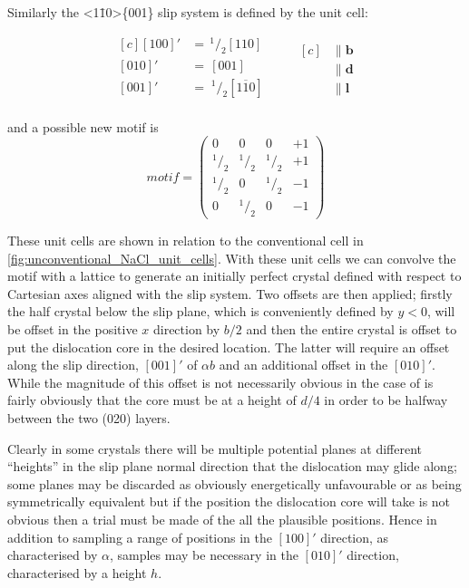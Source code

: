 Similarly the  <1\={1}0>\{001\} slip system is defined by the unit cell:

\begin{equation*}
\begin{aligned}[c]
 {[100]}' &=\, ^{1}\!/_{2} [110] \\
 {[010]}' &=\,  [001] \\
 {[001]}' &=\; ^{1}\!/_{2} [1\overline{1}0] \\
\end{aligned}
\qquad
\begin{aligned}[c]
&\parallel \mathbf{b} \\
&\parallel \mathbf{d} \\
&\parallel \mathbf{l}
\end{aligned}
\end{equation*}


and a possible new motif is 
$$
motif = \begin{pmatrix}
0 & 0 & 0 & +1 \\
^{1}\!/_{2} & ^{1}\!/_{2} & ^{1}\!/_{2} & +1 \\
^{1}\!/_{2} & 0 & ^{1}\!/_{2} & -1 \\
0 & ^{1}\!/_{2} & 0 & -1
\end{pmatrix}
$$


These unit cells are shown in relation to the conventional cell in \autoref{fig:unconventional_NaCl_unit_cells}. With these unit cells we can convolve the motif with a lattice to generate an initially perfect crystal defined with respect to Cartesian axes aligned with the slip system. Two offsets are then applied; firstly the half crystal below the slip plane, which is conveniently defined by $y < 0$, will be offset in the positive $x$ direction by $b/2$ and then the entire crystal is offset to put the dislocation core in the desired location. The latter will require an offset along the slip direction, $[001]'$ of $\alpha b$ and an additional offset in the $[010]'$. While the magnitude of this offset is not necessarily obvious in the case of  is fairly obviously that the core must be at a height of $d/4$ in order to be halfway between the two (020) layers.


Clearly in some crystals there will be multiple potential planes at different ``heights'' in the slip plane normal direction that the dislocation may glide along; some planes may be discarded as obviously energetically unfavourable or as being symmetrically equivalent but if the position the dislocation core will take is not obvious then a trial must be made of the all the plausible positions. Hence in addition to sampling a range of positions in the $[100]'$ direction, as characterised by $\alpha$, samples may be necessary in the $[010]'$ direction, characterised by a height $h$.

